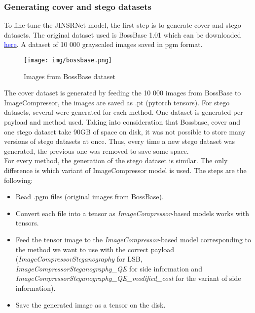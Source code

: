 \documentclass[12pt]{article}
\begin{document}
\subsubsection{Generating cover and stego datasets}
To fine-tune the JINSRNet model, the first step is to generate cover and stego datasets. The original dataset used is BossBase 1.01 which can be downloaded \href{https://dde.binghamton.edu/download/}{\textcolor{blue}{here}}. A dataset of 10 000 grayscaled images saved in pgm format. 

\begin{figure}[H]
    \texttt{[image: img/bossbase.png]}
    \caption[BossBase]{Images from BossBase dataset}
    \label{fig:bossbase}
\end{figure}

The cover dataset is generated by feeding the 10 000 images from BossBase to ImageCompressor, the images are saved as .pt (pytorch tensors). For stego datasets, several were generated for each method. One dataset is generated per payload and method used. Taking into consideration that Bossbase, cover and one stego dataset take 90GB of space on disk, it was not possible to store many versions of stego datasets at once. Thus, every time a new stego dataset was generated, the previous one was removed to save some space.\\
For every method, the generation of the stego dataset is similar. The only difference is which variant of ImageCompressor model is used. The steps are the following:
\begin{itemize}
    \item Read .pgm files (original images from BossBase).
    \item Convert each file into a tensor as \textit{ImageCompressor}-based models works with tensors.
    \item Feed the tensor image to the \textit{ImageCompressor}-based model corresponding to the method we want to use with the correct payload (\textit{ImageCompressorSteganography} for LSB, \textit{ImageCompressorSteganography\_QE} for side information and \textit{ImageCompressorSteganography\_QE\_modified\_cost} for the variant of side information).
    \item Save the generated image as a tensor on the disk.
\end{itemize}
\end{document}

